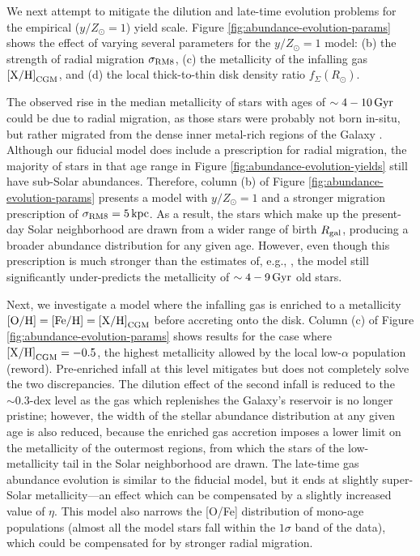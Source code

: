 \documentclass[twocolumn,twocolappendix,linenumbers]{aastex631}
\newcommand{\todo}[1]{{\color{red}#1}}
\newcommand{\mathXH}{{\rm [X/H]}}
\newcommand{\mathOH}{{\rm [O/H]}}
\newcommand{\mathFeH}{{\rm [Fe/H]}}
\newcommand{\yZ}[1]{$y/Z_\odot=#1$}
\newcommand{\kpc}{\,{\rm kpc}}
\begin{document}
We next attempt to mitigate the dilution and late-time evolution problems for the empirical (\yZ{1}) yield scale. 
Figure \ref{fig:abundance-evolution-params} shows the effect of varying several parameters for the \yZ{1} model: (b) the strength of radial migration $\sigma_{\rm RM8}$, (c) the metallicity of the infalling gas $\mathXH_{\rm CGM}$, and (d) the local thick-to-thin disk density ratio $f_\Sigma(R_\odot)$.

The observed rise in the median metallicity of stars with ages of $\sim4-10\,{\rm Gyr}$ could be due to radial migration, as those stars were probably not born in-situ, but rather migrated from the dense inner metal-rich regions of the Galaxy \citep{feuillet_age-resolved_2018}. Although our fiducial model does include a prescription for radial migration, the majority of stars in that age range in Figure \ref{fig:abundance-evolution-yields} still have sub-Solar abundances. Therefore, column (b) of Figure \ref{fig:abundance-evolution-params} presents a model with $y/Z_\odot=1$ and a stronger migration prescription of $\sigma_{\rm RM8}=5\kpc$. As a result, the stars which make up the present-day Solar neighborhood are drawn from a wider range of birth $R_{\rm gal}$, producing a broader abundance distribution for any given age. However, even though this prescription is much stronger than the estimates of, e.g., \citet{frankel_measuring_2018}, the model still significantly under-predicts the metallicity of $\sim4-9\,{\rm Gyr}$ old stars.

Next, we investigate a model where the infalling gas is enriched to a metallicity $\mathOH=\mathFeH={\rm [X/H]}_{\rm CGM}$ before accreting onto the disk. Column (c) of Figure \ref{fig:abundance-evolution-params} shows results for the case where ${\rm [X/H]}_{\rm CGM}=-0.5$, the highest metallicity allowed by the local low-$\alpha$ population \todo{(reword}). Pre-enriched infall at this level mitigates but does not completely solve the two discrepancies. The dilution effect of the second infall is reduced to the $\sim0.3$-dex level as the gas which replenishes the Galaxy's reservoir is no longer pristine; however, the width of the stellar abundance distribution at any given age is also reduced, because the enriched gas accretion imposes a lower limit on the metallicity of the outermost regions, from which the stars of the low-metallicity tail in the Solar neighborhood are drawn. The late-time gas abundance evolution is similar to the fiducial model, but it ends at slightly super-Solar metallicity---an effect which can be compensated by a slightly increased value of $\eta$. This model also narrows the [O/Fe] distribution of mono-age populations (almost all the model stars fall within the $1\sigma$ band of the data), which could be compensated for by stronger radial migration.
\end{document}
